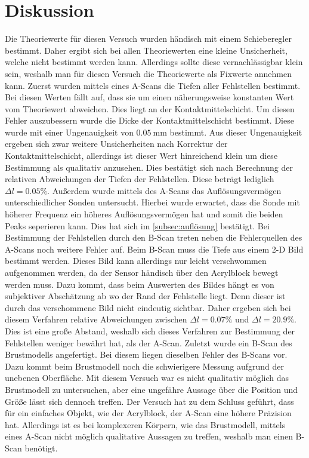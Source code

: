 \section{Diskussion}
\label{sec:Diskussion}
Die Theoriewerte für diesen Versuch wurden händisch mit einem Schieberegler bestimmt. Daher ergibt sich bei allen Theoriewerten eine kleine Unsicherheit, welche 
nicht bestimmt werden kann. Allerdings sollte diese vernachlässigbar klein sein, weshalb man für diesen Versuch die Theoriewerte als Fixwerte annehmen kann. 
Zuerst wurden mittels eines A-Scans die Tiefen aller Fehlstellen bestimmt. Bei diesen Werten fällt auf, dass sie um einen näherungsweise konstanten Wert vom Theoriewert abweichen.
Dies liegt an der Kontaktmittelschicht. Um diesen Fehler auszubessern wurde die Dicke der Kontaktmittelschicht bestimmt. Diese wurde mit einer Ungenauigkeit von $\qty{0.05}{\milli\metre}$
bestimmt. Aus dieser Ungenauigkeit ergeben sich zwar weitere Unsicherheiten nach Korrektur der Kontaktmittelschicht, allerdings ist dieser Wert hinreichend klein um diese Bestimmung als qualitativ anzusehen. 
Dies bestätigt sich nach Berechnung der relativen Abweichungen der Tiefen der Fehlstellen. Diese beträgt lediglich $\Delta l = 0.05\%$. Außerdem wurde mittels des A-Scans das
Auflösungsvermögen unterschiedlicher Sonden untersucht. Hierbei wurde erwartet, dass die Sonde mit höherer Frequenz ein höheres Auflösungsvermögen hat und somit die beiden Peaks 
seperieren kann. Dies hat sich im \autoref{subsec:auflösung} bestätigt. Bei Bestimmung der Fehlstellen durch den B-Scan treten neben die Fehlerquellen des A-Scans noch weitere Fehler auf.
Beim B-Scan muss die Tiefe aus einem 2-D Bild bestimmt werden. Dieses Bild kann allerdings nur leicht verschwommen aufgenommen werden, da der Sensor händisch über den Acrylblock bewegt 
werden muss. Dazu kommt, dass beim Auswerten des Bildes hängt es von subjektiver Abschätzung ab wo der Rand der Fehlstelle liegt. Denn dieser ist durch das verschommene Bild nicht 
eindeutig sichtbar. Daher ergeben sich bei diesem Verfahren relative Abweichungen zwischen $\Delta l = 0.07\%$ und $\Delta l = 20.9\%$. Dies ist eine große Abstand, weshalb 
sich dieses Verfahren zur Bestimmung der Fehlstellen weniger bewährt hat, als der A-Scan. Zuletzt wurde ein B-Scan des Brustmodells angefertigt. Bei diesem liegen dieselben Fehler des B-Scans
vor. Dazu kommt beim Brustmodell noch die schwierigere Messung aufgrund der unebenen Oberfläche. Mit diesem Versuch war es nicht qualitativ möglich das Brustmodell zu untersuchen, 
aber eine ungefähre Aussage über die Position und Größe lässt sich dennoch treffen. Der Versuch hat zu dem Schluss geführt, dass für ein einfaches Objekt, wie der Acrylblock, 
der A-Scan eine höhere Präzision hat. Allerdings ist es bei komplexeren Körpern, wie das Brustmodell, mittels eines A-Scan nicht möglich qualitative Aussagen zu treffen, weshalb man
einen B-Scan benötigt.